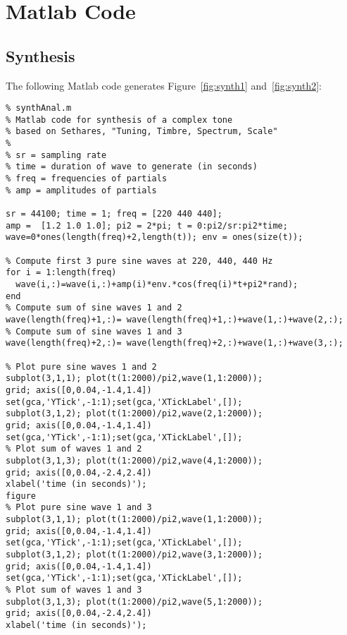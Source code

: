 \section{Matlab Code}
\subsection{Synthesis}
The following Matlab code generates Figure~\ref{fig:synth1}
and~\ref{fig:synth2}:
\begin{verbatim}
% synthAnal.m
% Matlab code for synthesis of a complex tone
% based on Sethares, "Tuning, Timbre, Spectrum, Scale"
%
% sr = sampling rate
% time = duration of wave to generate (in seconds)
% freq = frequencies of partials
% amp = amplitudes of partials

sr = 44100; time = 1; freq = [220 440 440]; 
amp =  [1.2 1.0 1.0]; pi2 = 2*pi; t = 0:pi2/sr:pi2*time; 
wave=0*ones(length(freq)+2,length(t)); env = ones(size(t));

% Compute first 3 pure sine waves at 220, 440, 440 Hz
for i = 1:length(freq)
  wave(i,:)=wave(i,:)+amp(i)*env.*cos(freq(i)*t+pi2*rand);
end
% Compute sum of sine waves 1 and 2
wave(length(freq)+1,:)= wave(length(freq)+1,:)+wave(1,:)+wave(2,:);
% Compute sum of sine waves 1 and 3
wave(length(freq)+2,:)= wave(length(freq)+2,:)+wave(1,:)+wave(3,:);

% Plot pure sine waves 1 and 2
subplot(3,1,1); plot(t(1:2000)/pi2,wave(1,1:2000)); 
grid; axis([0,0.04,-1.4,1.4])
set(gca,'YTick',-1:1);set(gca,'XTickLabel',[]);
subplot(3,1,2); plot(t(1:2000)/pi2,wave(2,1:2000)); 
grid; axis([0,0.04,-1.4,1.4])
set(gca,'YTick',-1:1);set(gca,'XTickLabel',[]);
% Plot sum of waves 1 and 2
subplot(3,1,3); plot(t(1:2000)/pi2,wave(4,1:2000)); 
grid; axis([0,0.04,-2.4,2.4])
xlabel('time (in seconds)'); 
figure
% Plot pure sine wave 1 and 3
subplot(3,1,1); plot(t(1:2000)/pi2,wave(1,1:2000)); 
grid; axis([0,0.04,-1.4,1.4])
set(gca,'YTick',-1:1);set(gca,'XTickLabel',[]);
subplot(3,1,2); plot(t(1:2000)/pi2,wave(3,1:2000)); 
grid; axis([0,0.04,-1.4,1.4])
set(gca,'YTick',-1:1);set(gca,'XTickLabel',[]);
% Plot sum of waves 1 and 3
subplot(3,1,3); plot(t(1:2000)/pi2,wave(5,1:2000)); 
grid; axis([0,0.04,-2.4,2.4])
xlabel('time (in seconds)'); 

\end{verbatim}

